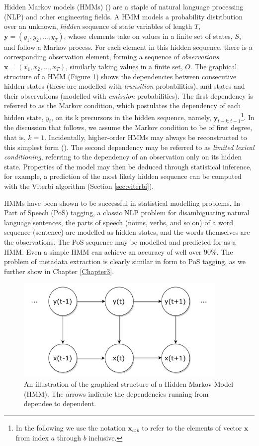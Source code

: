 Hidden Markov models (HMMs) (\cite{rabiner1989tutorial}) are a staple of natural language processing (NLP) and other engineering fields. A HMM models a probability distribution over an unknown, \emph{hidden} sequence of state variables of length $T$, $\mathbf{y} = (y_1, y_2, ..., y_T)$, whose elements take on values in a finite set of states, $S$, and follow a Markov process. For each element in this hidden sequence, there is a corresponding observation element, forming a sequence of \emph{observations}, $\mathbf{x} = (x_1, x_2, ..., x_T)$, similarly taking values in a finite set, $O$. The graphical structure of a HMM (Figure \ref{fig:HMM}) shows the dependencies between consecutive hidden states (these are modelled with \emph{transition} probabilities), and states and their observations (modelled with \emph{emission} probabilities). The first dependency is referred to as the Markov condition, which postulates the dependency of each hidden state, $y_t$, on its k precursors in the hidden sequence, namely, $\mathbf{y}_{t-k:t-1}$\footnote{In the following we use the notation $\mathbf{x}_{a:b}$ to refer to the elements of vector $\mathbf{x}$ from index $a$ through $b$ inclusive.}. In the discussion that follows, we assume the Markov condition to be of first degree, that is, $k =1$. Incidentally, higher-order HMMs may always be reconstructed to this simplest form (\cite{reference}). The second dependency may be referred to as \emph{limited lexical conditioning}, referring to the dependency of an observation only on its hidden state. Properties of the model may then be deduced through statistical inference, for example, a prediction of the most likely hidden sequence can be computed with the Viterbi algorithm (Section \ref{sec:viterbi}).

HMMs have been shown to be successful in statistical modelling problems. In Part of Speech (PoS) tagging, a classic NLP problem for disambiguating natural language sentences, the parts of speech (nouns, verbs, and so on) of a word sequence (sentence) are modelled as hidden states, and the words themselves are the observations. The PoS sequence may be modelled and predicted for as a HMM. Even a simple HMM can achieve an accuracy of well over $90\%$. The problem of metadata extraction is clearly similar in form to PoS tagging, as we further show in Chapter \ref{Chapter3}.

\begin{figure}[!ht]
\center
\includegraphics[width=4in]{Figures/HMM.pdf}
\caption{An illustration of the graphical structure of a Hidden Markov Model (HMM). The arrows indicate the dependencies running from dependee to dependent.}
\label{fig:HMM}
\end{figure}

